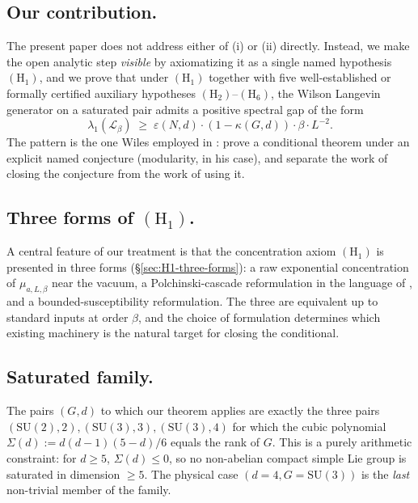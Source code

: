 \documentclass[11pt,reqno]{amsart}
\theoremstyle{plain}
\theoremstyle{definition}
\theoremstyle{remark}
\newcommand{\calL}{\mathcal{L}}
\begin{document}
\subsection{Our contribution.}
The present paper does not address either of (i) or (ii) directly. Instead, we make the open analytic step \emph{visible} by axiomatizing it as a single named hypothesis $(\mathrm{H}_1)$, and we prove that under $(\mathrm{H}_1)$ together with five well-established or formally certified auxiliary hypotheses $(\mathrm{H}_2)$--$(\mathrm{H}_6)$, the Wilson Langevin generator on a saturated pair admits a positive spectral gap of the form
\[
  \lambda_1(\calL_\beta) \;\ge\; \varepsilon(N, d) \cdot (1 - \kappa(G, d)) \cdot \beta \cdot L^{-2}.
\]
The pattern is the one Wiles employed in \cite{Wiles1995}: prove a conditional theorem under an explicit named conjecture (modularity, in his case), and separate the work of closing the conjecture from the work of using it.

\subsection{Three forms of $(\mathrm{H}_1)$.}
A central feature of our treatment is that the concentration axiom $(\mathrm{H}_1)$ is presented in three forms (\S\ref{sec:H1-three-forms}): a raw exponential concentration of $\mu_{a,L,\beta}$ near the vacuum, a Polchinski-cascade reformulation in the language of \cite{BD22, BBD24}, and a bounded-susceptibility reformulation. The three are equivalent up to standard inputs at order $\beta$, and the choice of formulation determines which existing machinery is the natural target for closing the conditional.

\subsection{Saturated family.}
The pairs $(G, d)$ to which our theorem applies are exactly the three pairs $(\mathrm{SU}(2), 2), (\mathrm{SU}(3), 3), (\mathrm{SU}(3), 4)$ for which the cubic polynomial $\Sigma(d) := d(d-1)(5-d)/6$ equals the rank of $G$. This is a purely arithmetic constraint: for $d \ge 5$, $\Sigma(d) \le 0$, so no non-abelian compact simple Lie group is saturated in dimension $\ge 5$. The physical case $(d=4, G = \mathrm{SU}(3))$ is the \emph{last} non-trivial member of the family.
\end{document}

